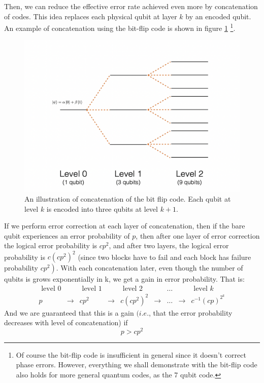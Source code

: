 Then, we can reduce the effective error rate achieved even more by concatenation of codes. 
This idea replaces each physical qubit at layer $k$ by an encoded qubit. An example of concatenation using the bit-flip code is shown in figure \ref{fig:codeconc} \footnote{Of course the bit-flip code is insufficient in general since it doesn’t correct phase errors. However, everything we shall demonstrate with the bit-flip code also holds for more general quantum codes, as the 7 qubit code.}.
\begin{figure}[h!]
    \centering
    \includegraphics[scale=0.5]{Mainmatter/images/concatenation.png}
    \caption{An illustration of concatenation of the bit flip code. Each qubit at level $k$ is encoded into three qubits at level $k + 1$.}
    \label{fig:codeconc}
\end{figure}

If we perform error correction at each layer of concatenation, then if the bare qubit experiences an error probability of $p$, then after one layer of error correction the logical error probability is $c p^{2}$, and after two layers, the logical error probability is $c\left(c p^{2}\right)^{2}$ (since two blocks have to fail and each block has failure probability $\left.c p^{2}\right)$. With each concatenation later, even though the number of qubits is grows exponentially in k, we get a gain in error probability. That is:
$$
\begin{array}{cccccccccc}
\text { level } 0 & & \text { level } 1 & & \text { level } 2 & & \ldots  & & \text { level } k\\
p &\rightarrow & c p^{2} &\rightarrow & c\left(c p^{2}\right)^{2} &\rightarrow& \ldots &\rightarrow& c^{-1}(c p)^{2^{k}}
\end{array}
$$
And we are guaranteed that this is a gain $(i . e .$, that the error probability decreases with level of concatenation) if
\begin{equation}
p > c p^2
\label{eq:plesscpp}
\end{equation}

